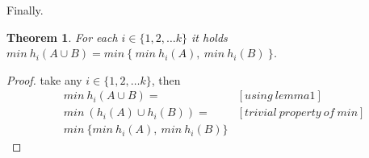 \documentclass[a4paper]{article}
\newtheorem{theorem}{Theorem}
\begin{document}
Finally.
\begin{theorem}
For each $i \in \{1, 2, \dots k\}$ it holds $min\ h_i(A \cup B) = min\ \{\ min\ h_i(A),\ min\ h_i(B)\ \}$.
\end{theorem}
\begin{proof}
take any $i \in \{1, 2, \dots k\}$, then
\begin{align*}
& min\ h_i(A \cup B) = &[using\ lemma1]\\
& min\ (h_i(A) \cup h_i(B)) = &[trivial\ property\ of\ min]\\
& min\ \{ min\ h_i(A),\ min\ h_i(B) \}
\end{align*}
\end{proof}
\end{document}

